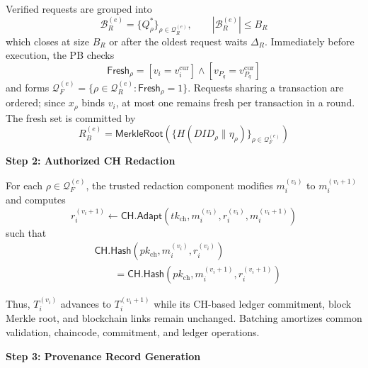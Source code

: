 \documentclass[lettersize,journal]{IEEEtran}
\begin{document}
Verified requests are grouped into
\begin{equation}
\mathcal{B}_{R}^{(e)}
=
\{Q_\rho^{*}\}_{\rho\in\mathcal{Q}_R^{(e)}},
\qquad
|\mathcal{B}_{R}^{(e)}|\le B_R
\label{eq:redaction-batch}
\end{equation}
which closes at size $B_R$ or after the oldest request waits $\Delta_R$.
Immediately before execution, the PB checks
\begin{equation}
\mathsf{Fresh}_\rho=
[v_i=v_i^{\mathrm{cur}}]\land
[v_{P_q}=v_{P_q}^{\mathrm{cur}}]
\label{eq:redaction-revalidation}
\end{equation}
and forms
$\mathcal{Q}_F^{(e)}
=\{\rho\in\mathcal{Q}_R^{(e)}:\mathsf{Fresh}_\rho=1\}$.
Requests sharing a transaction are ordered; since $x_\rho$ binds $v_i$,
at most one remains fresh per transaction in a round. The fresh set is
committed by
\begin{equation}
R_B^{(e)}
=
\mathsf{MerkleRoot}
\left(
\{H(DID_\rho\parallel\eta_\rho)\}_{\rho\in\mathcal{Q}_F^{(e)}}
\right)
\label{eq:redaction-batch-root}
\end{equation}

\noindent\textbf{Step 2: Authorized CH Redaction}

For each $\rho\in\mathcal{Q}_F^{(e)}$, the trusted redaction component
modifies $m_i^{(v_i)}$ to $m_i^{(v_i+1)}$ and computes
\begin{equation}
r_i^{(v_i+1)}
\leftarrow
\mathsf{CH.Adapt}
(tk_{\mathrm{ch}},m_i^{(v_i)},r_i^{(v_i)},m_i^{(v_i+1)})
\label{eq:ch-adapt}
\end{equation}
such that
\begin{equation}
\begin{aligned}
&\mathsf{CH.Hash}(pk_{\mathrm{ch}},m_i^{(v_i)},r_i^{(v_i)})\\
&\qquad=
\mathsf{CH.Hash}(pk_{\mathrm{ch}},m_i^{(v_i+1)},r_i^{(v_i+1)})
\end{aligned}
\label{eq:ch-collision}
\end{equation}

Thus, $T_i^{(v_i)}$ advances to $T_i^{(v_i+1)}$ while its CH-based
ledger commitment, block Merkle root, and blockchain links remain
unchanged. Batching amortizes common validation, chaincode, commitment,
and ledger operations.

\noindent\textbf{Step 3: Provenance Record Generation}
\end{document}
